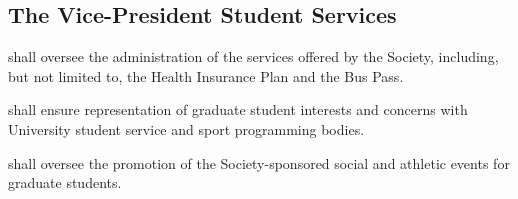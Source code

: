 \subsection {The Vice-President Student Services} 
\begin{longenum}[ label*=\arabic*., align=left]
	\item shall oversee the administration of the services offered by the Society, including, but not limited to, the Health Insurance Plan and the Bus Pass.
    \item shall ensure representation of graduate student interests and concerns with University student service and sport programming bodies.
    \item shall oversee the promotion of the Society-sponsored social and athletic events for graduate students.
\end{longenum}
